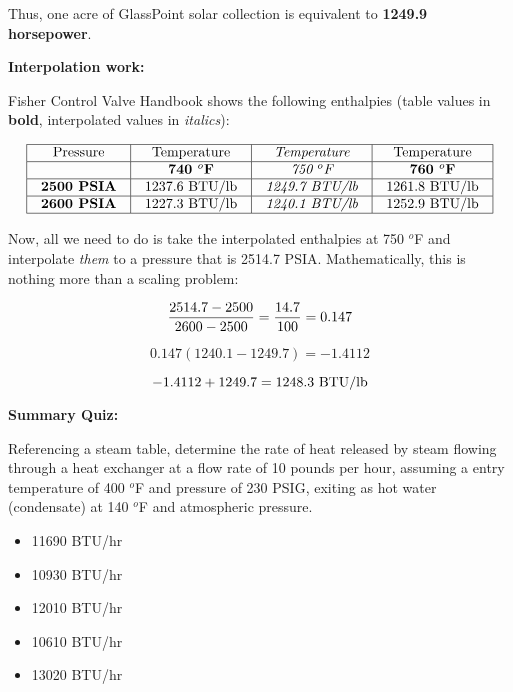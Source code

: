 Thus, one acre of GlassPoint solar collection is equivalent to {\bf 1249.9 horsepower}.

\vskip 20pt

\noindent
{\bf Interpolation work:}

\vskip 10pt

Fisher Control Valve Handbook shows the following enthalpies (table values in {\bf bold}, interpolated values in {\it italics}):


$$\vbox{\offinterlineskip
\halign{\strut
\vrule \quad\hfil # \ \hfil & 
\vrule \quad\hfil # \ \hfil & 
\vrule \quad\hfil # \ \hfil & 
\vrule \quad\hfil # \ \hfil \vrule \cr
\noalign{\hrule}
%
Pressure & Temperature & {\it Temperature} & Temperature \cr
%
\noalign{\hrule}
%
 & {\bf 740 $^{o}$F} &  {\it 750 $^{o}$F} & {\bf 760 $^{o}$F} \cr
%
\noalign{\hrule}
%
{\bf 2500 PSIA} & 1237.6 BTU/lb & {\it 1249.7 BTU/lb} & 1261.8 BTU/lb \cr
%
\noalign{\hrule}
%
{\bf 2600 PSIA} & 1227.3 BTU/lb & {\it 1240.1 BTU/lb} & 1252.9 BTU/lb \cr
%
\noalign{\hrule}
} %
}$$ %

Now, all we need to do is take the interpolated enthalpies at 750 $^{o}$F and interpolate {\it them} to a pressure that is 2514.7 PSIA.  Mathematically, this is nothing more than a scaling problem:

$${{2514.7 - 2500} \over {2600 - 2500}} = {14.7 \over 100} = 0.147$$

$$0.147 (1240.1 - 1249.7) = -1.4112$$

$$-1.4112 + 1249.7 = 1248.3 \hbox{ BTU/lb}$$






\vfil \eject

\noindent
{\bf Summary Quiz:}

Referencing a steam table, determine the rate of heat released by steam flowing through a heat exchanger at a flow rate of 10 pounds per hour, assuming a entry temperature of 400 $^{o}$F and pressure of 230 PSIG, exiting as hot water (condensate) at 140 $^{o}$F and atmospheric pressure.

\begin{itemize}
\item{} 11690 BTU/hr
\vskip 5pt 
\item{} 10930 BTU/hr
\vskip 5pt 
\item{} 12010 BTU/hr
\vskip 5pt 
\item{} 10610 BTU/hr
\vskip 5pt 
\item{} 13020 BTU/hr
\end{itemize}




